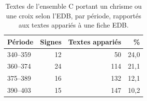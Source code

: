 \begin{table}[tbp]\centering\small\caption{Textes de l’ensemble C portant un chrisme ou une croix selon l’EDB, par période, rapportés aux textes appariés à une fiche EDB.}\label{tab:signesper}
\begin{tabular}{@{}l r r r@{}}\toprule Période & Signes & Textes appariés & \%\\\midrule
340–359 & 12 & 50 & 24,0 \\
360–374 & 24 & 114 & 21,1 \\
375–389 & 16 & 132 & 12,1 \\
390–403 & 15 & 147 & 10,2 \\
\bottomrule\end{tabular}\end{table}
